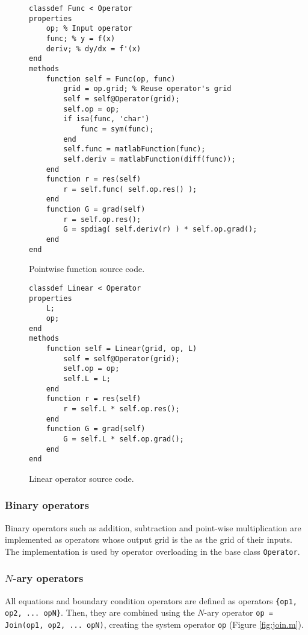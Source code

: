\documentclass[MSc,beforeExam]{iitcsthesis}
\begin{document}
\begin{figure}[h]
\begin{verbatim}
classdef Func < Operator
properties
    op; % Input operator
    func; % y = f(x)
    deriv; % dy/dx = f'(x)
end
methods
    function self = Func(op, func)
        grid = op.grid; % Reuse operator's grid
        self = self@Operator(grid);
        self.op = op;
        if isa(func, 'char')
        	func = sym(func); 
        end 
        self.func = matlabFunction(func);
        self.deriv = matlabFunction(diff(func));
    end
    function r = res(self)
        r = self.func( self.op.res() );
    end
    function G = grad(self)
        r = self.op.res();
        G = spdiag( self.deriv(r) ) * self.op.grad();
    end
end
\end{verbatim}
\caption{Pointwise function source code.} \label{fig:func.m}
\end{figure}
\begin{figure}[h]
\begin{verbatim}
classdef Linear < Operator
properties
    L;
    op;
end
methods
    function self = Linear(grid, op, L)
        self = self@Operator(grid);
        self.op = op;
        self.L = L;
    end
    function r = res(self)
        r = self.L * self.op.res();
    end
    function G = grad(self)
        G = self.L * self.op.grad();
    end
end
\end{verbatim}
\caption{Linear operator source code.} \label{fig:linear.m}
\end{figure}

\subsubsection{Binary operators}
Binary operators such as addition, subtraction and point-wise 
multiplication are implemented as operators whose
output grid is the as the grid of their inputs. 
The implementation is used by operator overloading in 
the base class \verb|Operator|.

\subsubsection{$N$-ary operators}
All equations and boundary condition operators are defined
as operators \verb|{op1, op2, ... opN}|. 
Then, they are combined using the $N$-ary operator 
\verb|op = Join(op1, op2, ... opN)|, creating
the system operator \verb|op| (Figure \ref{fig:join.m}).
\end{document}
